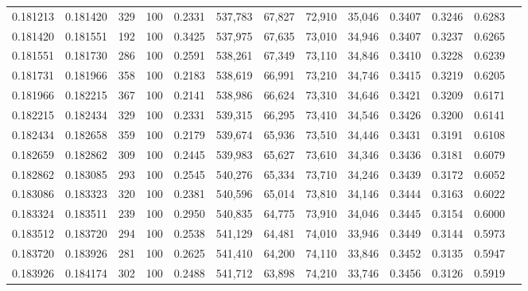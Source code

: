 \begin{tabular}{rrrrrrrrrrrrr}
0.181213 & 0.181420 &   329 & 100 &                                     0.2331 & 537,783 &  67,827 &  72,910 &  35,046 & 0.3407 & 0.3246 & 0.6283 \\
0.181420 & 0.181551 &   192 & 100 &                                     0.3425 & 537,975 &  67,635 &  73,010 &  34,946 & 0.3407 & 0.3237 & 0.6265 \\
0.181551 & 0.181730 &   286 & 100 &                                     0.2591 & 538,261 &  67,349 &  73,110 &  34,846 & 0.3410 & 0.3228 & 0.6239 \\
0.181731 & 0.181966 &   358 & 100 &                                     0.2183 & 538,619 &  66,991 &  73,210 &  34,746 & 0.3415 & 0.3219 & 0.6205 \\
0.181966 & 0.182215 &   367 & 100 &                                     0.2141 & 538,986 &  66,624 &  73,310 &  34,646 & 0.3421 & 0.3209 & 0.6171 \\
0.182215 & 0.182434 &   329 & 100 &                                     0.2331 & 539,315 &  66,295 &  73,410 &  34,546 & 0.3426 & 0.3200 & 0.6141 \\
0.182434 & 0.182658 &   359 & 100 &                                     0.2179 & 539,674 &  65,936 &  73,510 &  34,446 & 0.3431 & 0.3191 & 0.6108 \\
0.182659 & 0.182862 &   309 & 100 &                                     0.2445 & 539,983 &  65,627 &  73,610 &  34,346 & 0.3436 & 0.3181 & 0.6079 \\
0.182862 & 0.183085 &   293 & 100 &                                     0.2545 & 540,276 &  65,334 &  73,710 &  34,246 & 0.3439 & 0.3172 & 0.6052 \\
0.183086 & 0.183323 &   320 & 100 &                                     0.2381 & 540,596 &  65,014 &  73,810 &  34,146 & 0.3444 & 0.3163 & 0.6022 \\
0.183324 & 0.183511 &   239 & 100 &                                     0.2950 & 540,835 &  64,775 &  73,910 &  34,046 & 0.3445 & 0.3154 & 0.6000 \\
0.183512 & 0.183720 &   294 & 100 &                                     0.2538 & 541,129 &  64,481 &  74,010 &  33,946 & 0.3449 & 0.3144 & 0.5973 \\
0.183720 & 0.183926 &   281 & 100 &                                     0.2625 & 541,410 &  64,200 &  74,110 &  33,846 & 0.3452 & 0.3135 & 0.5947 \\
0.183926 & 0.184174 &   302 & 100 &                                     0.2488 & 541,712 &  63,898 &  74,210 &  33,746 & 0.3456 & 0.3126 & 0.5919 \\

\end{tabular}
